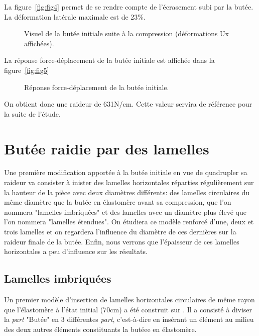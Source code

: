 ﻿ \documentclass{article}
\newcommand{\abaqus}{\bsc{Abaqus}\xspace}
\begin{document}
La figure~\ref{fig:fig4} permet de se rendre compte de l'écrasement subi par la butée. La déformation latérale maximale est de 23\%.

\begin{figure}[!h]
	\centering
	\caption{Visuel de la butée initiale suite à la compression (déformations Ux affichées).}
	\label{fig4}
\end{figure}

La réponse force-déplacement de la butée initiale est affichée dans la figure~\ref{fig:fig5}

\begin{figure}[!h]
	\centering
	\caption{Réponse force-déplacement de la butée initiale.}
	\label{fig5}
\end{figure}

On obtient donc une raideur de 631N/cm. Cette valeur servira de référence pour la suite de l'étude.


\section{Butée raidie par des lamelles}


Une première modification apportée à la butée initiale en vue de quadrupler sa raideur va consister à inister des lamelles horizontales réparties régulièrement sur la hauteur de la pièce avec deux diamètres différents: des lamelles circulaires du même diamètre que la butée en élastomère avant sa compression, que l'on nommera "lamelles imbriquées" et des lamelles avec un diamètre plus élevé que l'on nommera "lamelles étendues". On étudiera ce modèle renforcé d'une, deux et trois lamelles et on regardera l'influence du diamètre de ces dernières sur la raideur finale de la butée. Enfin, nous verrons que l'épaisseur de ces lamelles horizontales a peu d'influence sur les résultats.

\subsection{Lamelles imbriquées}

Un premier modèle d'insertion de lamelles horizontales circulaires de même rayon que l'élastomère à l'état initial (70cm) a été construit sur \abaqus. Il a consisté à diviser la \textit{part} "Butée" en 3 différentes \textit{part}, c'est-à-dire en insérant un élément au milieu des deux autres éléments constituants la butéee en élastomère.
\end{document}
